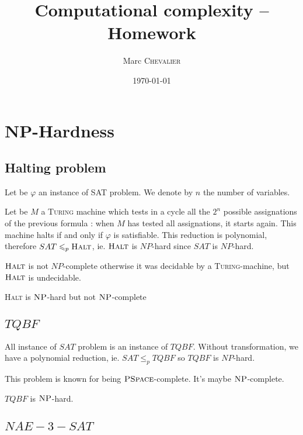 

\author{
    Marc \textsc{Chevalier}
}
\date{\today}
\title{Computational complexity \--- Homework}



\maketitle

\section{NP-Hardness}
\subsection{Halting problem}

Let be $\varphi$ an instance of SAT problem. We denote by $n$ the number of variables.

Let be $M$ a \textsc{Turing} machine which tests in a cycle all the $2^n$ possible assignations of the previous formula : when $M$ has tested all assignations, it starts again. This machine halts if and only if $\varphi$ is satisfiable. This reduction is polynomial, therefore $SAT \leqslant_p \textsc{Halt}$, ie. $\textsc{Halt}$ is $NP$-hard since $SAT$ is $NP$-hard.

$\textsc{Halt}$ is not $NP$-complete otherwise it was decidable by a \textsc{Turing}-machine, but $\textsc{Halt}$ is undecidable.

\begin{theorem}
    \textsc{Halt} is $\textsc{NP}$-hard but not $\textsc{NP}$-complete
\end{theorem}

\subsection{\texorpdfstring{$TQBF$}{TQBF}}

All instance of $SAT$ problem is an instance of $TQBF$. Without transformation, we have a polynomial reduction, ie. $SAT\leqslant_p TQBF$ so $TQBF$ is $NP$-hard.

This problem is known for being $\textsc{PSpace}$-complete. It's maybe $\textsc{NP}$-complete.

\begin{theorem}
    $TQBF$ is $\textsc{NP}$-hard.
\end{theorem}
   
\subsection{\texorpdfstring{$NAE-3-SAT$}{NAE-3-SAT}}

